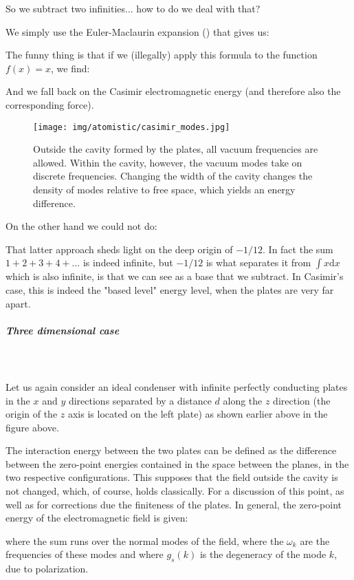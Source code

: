	So we subtract two infinities... how to do we deal with that?

	We simply use the Euler-Maclaurin expansion () that gives us:
	 
	The funny thing is that if we (illegally) apply this formula to the function $f (x) = x$, we find:
	
	And we fall back on the Casimir electromagnetic energy (and therefore also the corresponding force).
	\begin{figure}[H]
		\centering
		\texttt{[image: img/atomistic/casimir\_modes.jpg]}
		\caption[]{Outside  the  cavity  formed  by  the  plates,  all  vacuum frequencies are allowed.  Within the cavity, however, the vacuum modes take on discrete frequencies.  Changing the width of the cavity changes the density of modes relative to free space, which yields an energy difference.}
	\end{figure} 
	On the other hand we could not do:
	
	That latter approach sheds light on the deep origin of $-1/12$. In fact the sum $ 1 + 2 + 3 + 4 +\ldots $ is indeed infinite, but $-1/12$ is what separates it from $\int x \mathrm{d}x $ which is also infinite, is that we can see as a base that we subtract. In Casimir's case, this is indeed the "based level" energy level, when the plates are very far apart.
	
	\subparagraph{Three dimensional case}\mbox{}\\\\
	 Let us again consider an ideal condenser with infinite perfectly conducting plates in the $x$ and $y$ directions separated by a distance $d$ along the $z$ direction (the origin of the $z$ axis is located on the left plate) as shown earlier above in the figure above.

	The interaction energy between the two plates can be defined as the difference between the zero-point energies contained in the space between the planes, in the two respective configurations. This supposes that the field outside the cavity is not changed, which, of course, holds classically. For a discussion of this point, as well as for corrections due the finiteness of the plates. In general, the zero-point energy of the electromagnetic field is given:
	
	where the sum runs over the normal modes of the field, where the $\omega_{k}$ are the frequencies of these modes and where $g_{s}(k)$ is the degeneracy of the mode $k$, due to polarization.
	
